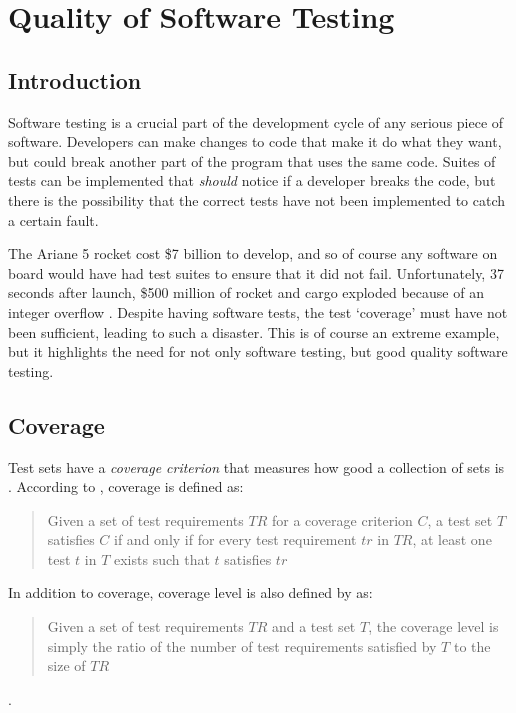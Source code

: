 \section{Quality of Software Testing}
\subsection{Introduction}
Software testing is a crucial part of the development cycle of any serious piece of software. Developers can make changes to code that make it do what they want, but could break another part of the program that uses the same code. Suites of tests can be implemented that \emph{should} notice if a developer breaks the code, but there is the possibility that the correct tests have not been implemented to catch a certain fault.

The Ariane 5 rocket cost \$7 billion to develop, and so of course any software on board would have had test suites to ensure that it did not fail. Unfortunately, 37 seconds after launch, \$500 million of rocket and cargo exploded because of an integer overflow \citep{ariane5}. Despite having software tests, the test `coverage' must have not been sufficient, leading to such a disaster. This is of course an extreme example, but it highlights the need for not only software testing, but good quality software testing.


\subsection{Coverage}

Test sets have a \emph{coverage criterion} that measures how good a collection of sets is \citep{softwareTestingIntro}. According to \citet{softwareTestingIntro}, coverage is defined as:

\begin{quote} Given a set of test requirements $TR$ for a coverage criterion $C$, a test set $T$ satisfies $C$ if and only if for every test requirement $tr$ in $TR$, at least one test $t$ in $T$ exists such that $t$ satisfies $tr$ \end{quote}

In addition to coverage, coverage level is also defined by \citep{softwareTestingIntro} as:

\begin{quote}Given a set of test requirements $TR$ and a test set $T$, the coverage level is simply the ratio of the number of test requirements satisfied by $T$ to the size of $TR$\end{quote}.

